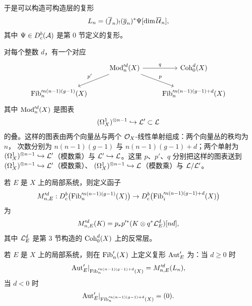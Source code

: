 于是可以构造可构造层的复形
\[
  L_n=(\overline f_n)_!(\overline g_n)^*\Psi[\dim\overline{\mathcal{U}}_n],
\]
其中 $\Psi\in D^{b}_{c}(\mathcal{A})$ 是第 0 节定义的复形。

对每个整数 $d$，有一个对应
\[
  \begin{tikzcd}
    & \Mod'^d_n(X) \arrow[r,"q"] \arrow[dl,swap,"p'"] \arrow[dr,"p"] & \Coh^d_0(X) \\
    \Fib'^{n(n-1)(g-1)}_n(X) & & \Fib'^{n(n-1)(g-1)+d}_n(X)
  \end{tikzcd}
\]
其中 $\operatorname{Mod}'^d_n(X)$ 是图表
\[
  (\Omega^{1}_{X})^{\otimes n-1}\hookrightarrow\mathcal{L}'\subset\mathcal{L}
\]
的叠。这样的图表由两个向量丛与两个 $\mathcal{O}_X$-线性单射组成：两个向量丛的秩均为 $n$，
次数分别为 $n(n-1)(g-1)$ 与 $n(n-1)(g-1)+d$；两个单射为
$(\Omega^{1}_{X})^{\otimes n-1}\hookrightarrow\mathcal{L}'$（模数乘）与 $\mathcal{L}'\hookrightarrow\mathcal{L}$。这里
$p$、$p'$、$q$ 分别把这样的图表送到 $(\Omega^{1}_{X})^{\otimes n-1}\hookrightarrow\mathcal{L}'$（模数乘）、
$(\Omega^{1}_{X})^{\otimes n-1}\hookrightarrow\mathcal{L}$（模数乘）与 $\mathcal{L}/\mathcal{L}'$。

若 $E$ 是 $X$ 上的局部系统，则定义函子
\[
  M'^d_{n,E}:D^{b}_{c}\bigl(\operatorname{Fib}'^{n(n-1)(g-1)}_n(X)\bigr)\to D^{b}_{c}\bigl(\operatorname{Fib}'^{n(n-1)(g-1)+d}_i(X)\bigr)
\]
为
\[
  M'^d_{n,E}(K)=p_*p'^*(K\otimes q^*\mathcal{L}^d_E)[nd],
\]
其中 $\mathcal{L}^d_E$ 是第 3 节构造的 $\operatorname{Coh}^d_0(X)$ 上的反常层。

\begin{definition}
  若 $E$ 是 $X$ 上的局部系统，则在 $\operatorname{Fib}'_n(X)$ 上定义复形 ${\operatorname{Aut}}'_E$ 为：当 $d\ge 0$ 时
  \[
    {\operatorname{Aut}}'_E|_{\operatorname{Fib}'^{n(n-1)(g-1)+d}_n(X)}=M'^d_{n,E}(L_n),
  \]
  当 $d<0$ 时
  \[
    {\operatorname{Aut}}'_E|_{\operatorname{Fib}'^{n(n-1)(g-1)+d}_n(X)}=(0).
  \]
\end{definition}
